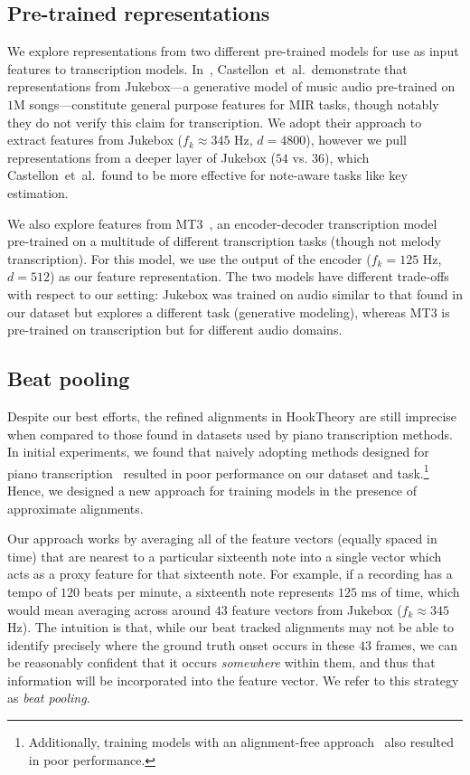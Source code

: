 \documentclass{article}
\newcommand{\mtthree}{MT3}
\newcommand{\jukebox}{Jukebox}
\newcommand{\hooktheory}{HookTheory}
\begin{document}
\subsection{Pre-trained representations}
\label{sec:representations}

We explore representations from two different pre-trained models for use as input features to transcription models.
In~\cite{castellon2021calm}, Castellon~et~al.\ demonstrate that representations from \jukebox---a generative model of music audio pre-trained on $1$M songs---constitute general purpose features for MIR tasks, though notably they do not verify this claim for transcription. 
We adopt their approach to extract features from \jukebox{} ($f_k \approx 345$ Hz, $d = 4800$), however we pull representations from a deeper layer of \jukebox{} ($54$ vs. $36$), which Castellon~et~al.\ found to be more effective for note-aware tasks like key estimation. 

We also explore features from \mtthree~\cite{gardner2021mt3}, an encoder-decoder transcription model pre-trained on a multitude of different transcription tasks (though not melody transcription). 
For this model, we use the output of the encoder ($f_k = 125$ Hz, $d = 512$) as our feature representation. 
The two models have different trade-offs with respect to our setting: \jukebox{} was trained on audio similar to that found in our dataset but explores a different task (generative modeling), whereas \mtthree{} is pre-trained on transcription but for different audio domains. 

\subsection{Beat pooling}

Despite our best efforts, the refined alignments in \hooktheory{} are still imprecise when compared to those found in datasets used by piano transcription methods. 
In initial experiments, we found that naively adopting methods designed for piano transcription~\cite{hawthorne2017onsets,hawthorne2021sequence} resulted in poor performance on our dataset and task.\footnote{Additionally, training models with an alignment-free approach~\cite{graves2006connectionist} also resulted in poor performance.} 
Hence, we designed a new approach for training models in the presence of approximate alignments. 

Our approach works by averaging all of the feature vectors (equally spaced in time) that are nearest to a particular sixteenth note into a single vector which acts as a proxy feature for that sixteenth note. 
For example, if a recording has a tempo of $120$ beats per minute, a sixteenth note represents $125$ ms of time, which would mean averaging across around $43$ feature vectors from \jukebox{} ($f_k \approx 345$ Hz). 
The intuition is that, while our beat tracked alignments may not be able to identify precisely where the ground truth onset occurs in these $43$ frames, we can be reasonably confident that it occurs \emph{somewhere} within them, and thus that information will be incorporated into the feature vector.
We refer to this strategy as \emph{beat pooling}.
\end{document}
